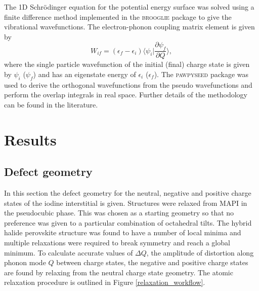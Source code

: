 The 1D Schr\"{o}dinger equation for the potential energy surface was solved using a finite difference method implemented in the \textsc{brooglie} package\autocite{brooglie} to give the vibrational wavefunctions. 
The electron-phonon coupling matrix element is given by
\begin{equation} \label{epcouplingterm}
    W_{if} = (\epsilon_f-\epsilon_i)\langle\psi_i|\frac{\partial\psi_f}{\partial Q}\rangle,
\end{equation}
where the single particle wavefunction of the initial (final) charge state is given by $\psi_i$ ($\psi_f$) and has an eigenstate energy of $\epsilon_i$ ($\epsilon_f$). The \textsc{pawpyseed} package\autocite{pawpyseed} was used to derive the orthogonal wavefunctions from the  pseudo wavefunctions and perform the overlap integrals in real space.
Further details of  the  methodology  can  be  found  in  the  literature.\autocite{Alkauskas2014} 

\section{Results} \label{ch:6-results}

\subsection{Defect geometry}

In this section the defect geometry for the neutral, negative and positive charge states of the iodine interstitial is given. Structures were relaxed from MAPI in the pseudocubic phase. This was chosen as a starting geometry so that no preference was given to a particular combination of octahedral tilts. The hybrid halide perovskite structure was found to have a number of local minima and multiple relaxations were required to break symmetry and reach a global minimum. To calculate accurate values of $\Delta Q$, the amplitude of distortion along phonon mode $Q$ between charge states, the negative and positive charge states are found by relaxing from the neutral charge state geometry. The atomic relaxation procedure is outlined in Figure \ref{relaxation_workflow}.

